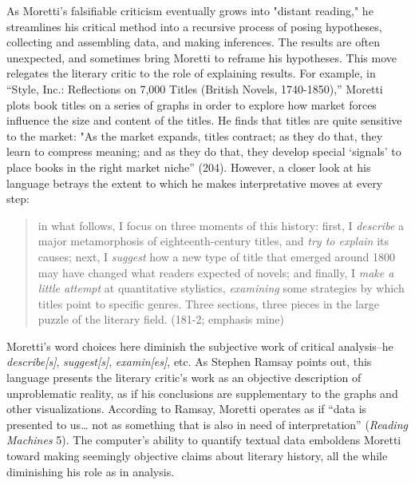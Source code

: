 \documentclass[11pt]{article}
\begin{document}
As Moretti's falsifiable criticism eventually grows into "distant
reading," he streamlines his critical method into a recursive process
of posing hypotheses, collecting and assembling data, and making
inferences. The results are often unexpected, and sometimes bring
Moretti to reframe his hypotheses. This move relegates the literary
critic to the role of explaining results. For example, in “Style,
Inc.: Reflections on 7,000 Titles (British Novels, 1740-1850),”
Moretti plots book titles on a series of graphs in order to explore
how market forces influence the size and content of the titles. He
finds that titles are quite sensitive to the market: "As the market
expands, titles contract; as they do that, they learn to compress
meaning; and as they do that, they develop special ‘signals’ to place
books in the right market niche” (204). However, a closer look at his
language betrays the extent to which he makes interpretative moves at
every step:
\begin{quote}
in what follows, I focus on three moments of this history: first, I
\emph{describe} a major metamorphosis of eighteenth-century titles, and
\emph{try to explain} its causes; next, I \emph{suggest} how a new type of title
that emerged around 1800 may have changed what readers expected of
novels; and finally, I \emph{make a little attempt} at quantitative
stylistics, \emph{examining} some strategies by which titles point to
specific genres. Three sections, three pieces in the large puzzle of
the literary field. (181-2; emphasis mine)
\end{quote}
Moretti’s word choices here diminish the subjective work of critical
analysis--he \emph{describe[s]}, \emph{suggest[s]}, \emph{examin[es]}, etc. As
Stephen Ramsay points out, this language presents the literary
critic's work as an objective description of unproblematic reality, as
if his conclusions are supplementary to the graphs and other
visualizations. According to Ramsay, Moretti operates as if “data is
presented to us\ldots{} not as something that is also in need of
interpretation” (\emph{Reading Machines} 5). The computer's ability to
quantify textual data emboldens Moretti toward making seemingly
objective claims about literary history, all the while diminishing his
role as in analysis.
\end{document}
